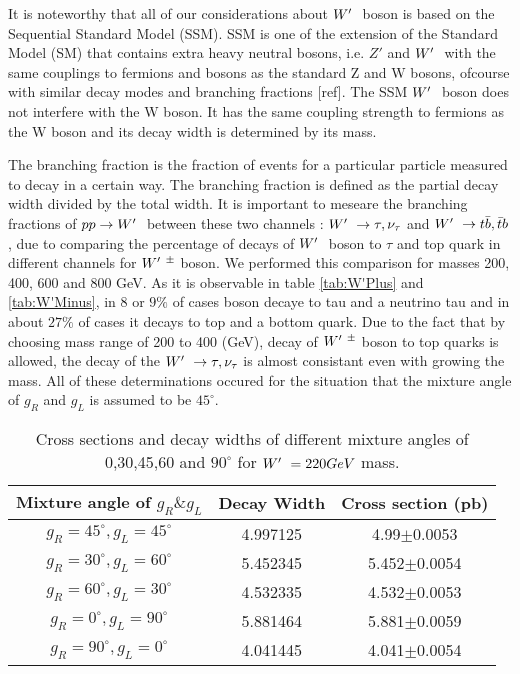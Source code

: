 It is noteworthy that all of our considerations about $ W^\prime~ $ boson is based on the Sequential Standard Model (SSM). SSM is one of the extension of the Standard Model (SM) that contains extra heavy neutral bosons, i.e. $ Z' $ and $ W^\prime~ $ with the same couplings to fermions and bosons as the standard Z and W bosons, ofcourse with similar decay modes and branching fractions [ref]. The SSM $ W^\prime~ $ boson does not interfere with the W boson. It has the same coupling strength to fermions as the W boson and its decay width is determined by its mass. 

  The branching fraction is the fraction of events for a particular particle measured to decay in a certain way. The branching fraction is defined as the partial decay width divided by the total width. It is important to meseare the branching fractions of $ pp\rightarrow W^\prime~$ between these two channels : $ W^\prime~\rightarrow \tau,\nu_\tau $ and $ W^\prime~\rightarrow  t \bar{b},\bar{t}b $, due to comparing the percentage of decays of $ W^\prime~ $ boson to $ \tau $ and top quark in different channels for $ W^\prime~^\pm $ boson. We performed this comparison for masses 200, 400, 600 and 800 GeV. As it is observable in table \ref{tab:W'Plus} and \ref{tab:W'Minus}, in 8 or $9\%$ of cases \wprime boson decaye to tau and a neutrino tau and in about $27\%$ of cases it decays to top and a bottom quark. Due to the fact that by choosing mass range of 200 to 400 (GeV), decay of $ W^\prime~^\pm $ boson to top quarks is allowed, the decay of the $ W^\prime~\rightarrow \tau,\nu_\tau $ is almost consistant even with growing the mass. All of these determinations occured for the situation that the mixture angle of $ g_R$ and  $g_L$ is assumed to be $45^\circ $. 
 



\begin{table}[htb]
	\centering
\begin{tabular}{|c|c|c|}
\hline 
Mixture angle of $ g_R \& g_L $  &  Decay Width  &  Cross section (pb)\\
\hline 
$g_R=45^\circ,g_L=45^\circ$& 4.997125& 4.99$\pm$0.0053\\
$g_R=30^\circ,g_L=60^\circ$ &5.452345& 5.452$\pm$0.0054\\
$g_R=60^\circ,g_L=30^\circ$& 4.532335& 4.532$\pm$0.0053 \\
$g_R=0^\circ,g_L=90^\circ$&5.881464& 5.881$\pm$0.0059\\
$g_R=90^\circ,g_L=0^\circ$& 4.041445& 4.041$\pm$0.0054\\


\hline
\end{tabular}
\caption{Cross sections and decay widths of different mixture angles of 0,30,45,60 and $90^\circ$ for $W^\prime~ =220 GeV$ mass. \label{tab:220 GeV} }
\end{table}



